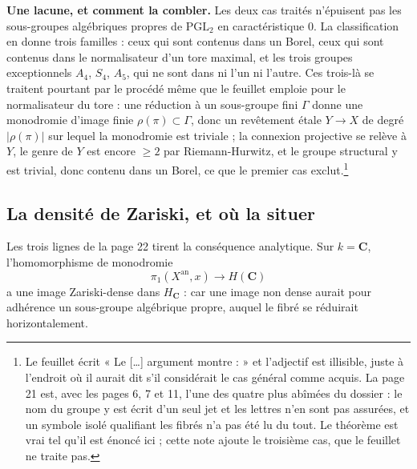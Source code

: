 \documentclass[11pt,a4paper]{article}
\begin{document}
\textbf{Une lacune, et comment la combler.} Les deux cas traités
n'épuisent pas les sous-groupes algébriques propres de $\mathrm{PGL}_2$ en
caractéristique $0$. La classification en donne trois familles : ceux qui sont
contenus dans un Borel, ceux qui sont contenus dans le normalisateur d'un tore
maximal, et les trois groupes exceptionnels $A_4$, $S_4$, $A_5$, qui ne sont
dans ni l'un ni l'autre. Ces trois-là se traitent pourtant par le procédé même
que le feuillet emploie pour le normalisateur du tore : une réduction à un
sous-groupe fini $\Gamma$ donne une monodromie d'image finie
$\rho(\pi) \subset \Gamma$, donc un revêtement étale $Y \to X$ de degré
$|\rho(\pi)|$ sur lequel la monodromie est triviale ; la connexion projective se relève à $Y$, le genre de $Y$ est encore
$\geqslant 2$ par Riemann-Hurwitz, et le groupe structural y est trivial, donc
contenu dans un Borel, ce que le premier cas exclut.\footnote{Le feuillet
écrit « Le [\ldots] argument montre : » et l'adjectif est illisible, juste à
l'endroit où il aurait dit s'il considérait le cas général comme acquis. La
page 21 est, avec les pages 6, 7 et 11, l'une des quatre plus abîmées du
dossier : le nom du groupe y est écrit d'un seul jet et les lettres n'en sont
pas assurées, et un symbole isolé qualifiant les fibrés n'a pas été lu du
tout. Le théorème est vrai tel qu'il est énoncé ici ; cette note ajoute le
troisième cas, que le feuillet ne traite pas.}

\subsection*{La densité de Zariski, et où la situer}

Les trois lignes de la page 22 tirent la conséquence analytique. Sur
$k = \mathbf{C}$, l'homomorphisme de monodromie
\[
  \pi_1(X^{\mathrm{an}}, x) \longrightarrow H(\mathbf{C})
\]
a une image Zariski-dense dans $H_{\mathbf{C}}$ : car une image non dense
aurait pour adhérence un sous-groupe algébrique propre, auquel le fibré se
réduirait horizontalement.
\end{document}
